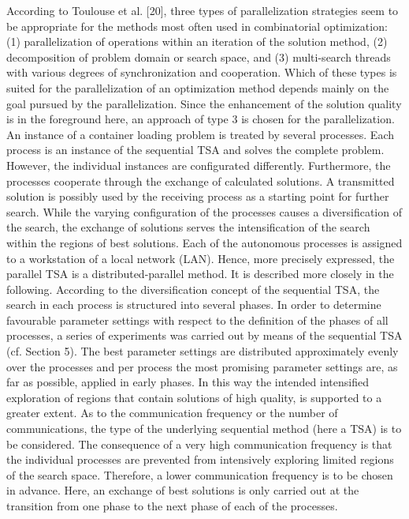 

According to Toulouse et al. [20], three types of parallelization strategies seem to
be appropriate for the methods most often used in combinatorial optimization: (1)
parallelization of operations within an iteration of the solution method, (2) decomposition
of problem domain or search space, and (3) multi-search threads with various
degrees of synchronization and cooperation. Which of these types is suited for
the parallelization of an optimization method depends mainly on the goal pursued
by the parallelization. Since the enhancement of the solution quality is in the foreground
here, an approach of type 3 is chosen for the parallelization.
An instance of a container loading problem is treated by several processes. Each
process is an instance of the sequential TSA and solves the complete problem. However,
the individual instances are configurated differently. Furthermore, the processes
cooperate through the exchange of calculated solutions. A transmitted solution is
possibly used by the receiving process as a starting point for further search. While
the varying configuration of the processes causes a diversification of the search,
the exchange of solutions serves the intensification of the search within the regions
of best solutions.
Each of the autonomous processes is assigned to a workstation of a local network
(LAN). Hence, more precisely expressed, the parallel TSA is a distributed-parallel
method. It is described more closely in the following.
According to the diversification concept of the sequential TSA, the search in each
process is structured into several phases. In order to determine favourable parameter
settings with respect to the definition of the phases of all processes, a series of experiments
was carried out by means of the sequential TSA (cf. Section 5). The best parameter
settings are distributed approximately evenly over the processes and per
process the most promising parameter settings are, as far as possible, applied in early
phases. In this way the intended intensified exploration of regions that contain solutions
of high quality, is supported to a greater extent.
As to the communication frequency or the number of communications, the type
of the underlying sequential method (here a TSA) is to be considered. The consequence
of a very high communication frequency is that the individual processes
are prevented from intensively exploring limited regions of the search space. Therefore,
a lower communication frequency is to be chosen in advance. Here, an exchange
of best solutions is only carried out at the transition from one phase to the
next phase of each of the processes.